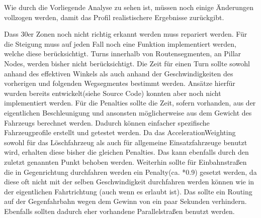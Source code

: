 Wie durch die Vorliegende Analyse zu sehen ist, müssen noch einige Änderungen vollzogen werden, damit das Profil realistischere Ergebnisse zurückgibt.\par
{}
Dass 30er Zonen noch nicht richtig erkannt werden muss repariert werden.
Für die Steigung muss auf jeden Fall noch eine Funktion implementiert werden, welche diese berücksichtigt.
Turns innerhalb von Routensegmenten, an Pillar Nodes, werden bisher nicht berücksichtigt.
Die Zeit für einen Turn sollte sowohl anhand des effektiven Winkels als auch anhand der Geschwindigkeiten des vorherigen und folgenden Wegsegmentes bestimmt werden. Ansätze hierfür wurden bereits entwickelt(siehe Source Code) konnten aber noch nicht implementiert werden.
Für die Penalties sollte die Zeit, sofern vorhanden, aus der eigentlichen Beschleunigung und ansonsten möglicherweise aus dem Gewicht des Fahrzeugs berechnet werden. Dadurch können einfacher spezifische Fahrzeugprofile erstellt und getestet werden.
Da das AccelerationWeighting sowohl für das Löschfahrzeug als auch für allgemeine Einsatzfahrzeuge benutzt wird, erhalten diese bisher die gleichen Penalties. Das kann ebenfalls durch den zuletzt genannten Punkt behoben werden.
Weiterhin sollte für Einbahnstraßen die in Gegenrichtung durchfahren werden ein Penalty(ca. *0.9) gesetzt werden, da diese oft nicht mit der selben Geschwindigkeit durchfahren werden können wie in der eigentlichen Fahrtrichtung (auch wenn es erlaubt ist). Das sollte ein Routing auf der Gegenfahrbahn wegen dem Gewinn von ein paar Sekunden verhindern. Ebenfalls sollten dadurch eher vorhandene Parallelstraßen benutzt werden.